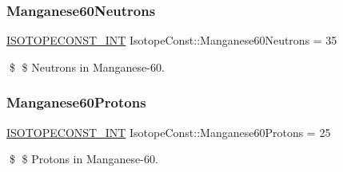 \subsubsection{\texorpdfstring{Manganese60\+Neutrons}{Manganese60Neutrons}}
{\footnotesize\ttfamily \mbox{\hyperlink{group___isotope_const-_macros_ga5f18360b3e99483a35c32d789e62621c}{I\+S\+O\+T\+O\+P\+E\+C\+O\+N\+S\+T\+\_\+\+I\+NT}} Isotope\+Const\+::\+Manganese60\+Neutrons = 35}

\$ \$ Neutrons in Manganese-\/60. \mbox{\label{group___isotope_const-_manganese-_mn60_gad6ad811365123cb45546b1e055dc7714}} 
\subsubsection{\texorpdfstring{Manganese60\+Protons}{Manganese60Protons}}
{\footnotesize\ttfamily \mbox{\hyperlink{group___isotope_const-_macros_ga5f18360b3e99483a35c32d789e62621c}{I\+S\+O\+T\+O\+P\+E\+C\+O\+N\+S\+T\+\_\+\+I\+NT}} Isotope\+Const\+::\+Manganese60\+Protons = 25}

\$ \$ Protons in Manganese-\/60. 